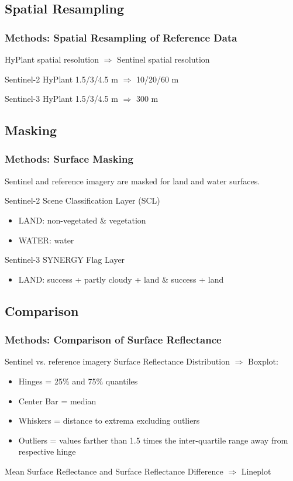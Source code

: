 \documentclass[9pt]{beamer}
\begin{document}
\subsection{Spatial Resampling}
\begin{frame}
\frametitle{Methods: Spatial Resampling of Reference Data}
HyPlant spatial resolution $\Rightarrow$ Sentinel spatial resolution
\begin{block}{Sentinel-2}
HyPlant 1.5/3/4.5 m $\Rightarrow$ 10/20/60 m
\end{block}
\begin{alertblock}{Sentinel-3}
HyPlant 1.5/3/4.5 m $\Rightarrow$ 300 m
\end{alertblock}
\end{frame}

\subsection{Masking}
\begin{frame}
\frametitle{Methods: Surface Masking}
Sentinel and reference imagery are masked for land and water surfaces.
\begin{block}{Sentinel-2}
Scene Classification Layer (SCL)
\begin{itemize}
\item LAND: non-vegetated \& vegetation
\item WATER: water
\end{itemize}
\end{block}
\begin{alertblock}{Sentinel-3}
SYNERGY Flag Layer
\begin{itemize}
\item LAND: success + partly cloudy + land \& success + land
\end{itemize}
\end{alertblock}
\end{frame}

\subsection{Comparison}
\begin{frame}
\frametitle{Methods: Comparison of Surface Reflectance}
Sentinel vs. reference imagery\newline\newline
Surface Reflectance Distribution $\Rightarrow$ Boxplot:
\begin{itemize}
\item Hinges = 25\% and 75\% quantiles
\item Center Bar = median
\item Whiskers = distance to extrema excluding outliers
\item Outliers = values farther than 1.5 times the inter-quartile range away from respective hinge\newline 
\end{itemize}
Mean Surface Reflectance and Surface Reflectance Difference $\Rightarrow$ Lineplot
\end{frame}
\end{document}
